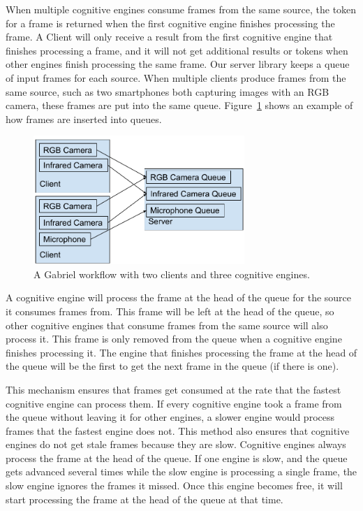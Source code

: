 When multiple cognitive engines consume frames from the same source, the token
for a frame is returned when the first cognitive engine finishes processing the
frame.
A Client will only receive a result from the first cognitive engine that
finishes processing a frame, and it will not get additional results or tokens
when other engines finish processing the same frame. Our server library keeps a
queue of input frames for each source. When multiple clients produce frames from
the same source, such as two smartphones both capturing images with an RGB
camera, these frames are put into the same queue.
Figure~\ref{fig:queues} shows an example of how frames are inserted into queues.

\begin{figure}[h!]
  \includegraphics[width=8cm]{figures/queues.pdf}
  \caption{A Gabriel workflow with two clients and three cognitive engines.
  }\label{fig:queues}
\end{figure}

A cognitive engine will process the
frame at the head of the queue for the source it consumes frames from. This
frame will be left at the head of the queue, so other cognitive engines that
consume frames from the same source will also process it. This frame is only
removed from the queue when a cognitive engine finishes processing it. The
engine that finishes processing the frame at the head of the queue will be the
first to get the next frame in the queue (if there is one).

This mechanism ensures that frames get consumed at the rate that the fastest
cognitive engine can process them.
If every cognitive engine took a frame from the queue without leaving it for
other engines, a slower engine would process frames that the fastest engine does
not.
This method also ensures that cognitive engines do not get stale
frames because they are slow. Cognitive engines always process the frame at the
head of the queue. If one engine is slow, and the queue gets advanced several
times while the slow engine is processing a single frame, the slow engine
ignores the frames it missed. Once this engine becomes free, it will start
processing the frame at the head of the queue at that time.

